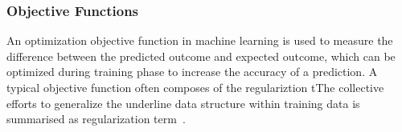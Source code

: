 \subsubsection{Objective Functions}
An optimization objective function in machine learning is used to measure the difference between the predicted outcome and expected outcome, which can be optimized during training phase to increase the accuracy of a prediction. A typical objective function often composes of the regulariztion tThe collective efforts to generalize the underline data structure within training data is summarised as regularization term~\cite{goodfellow_2015}.  